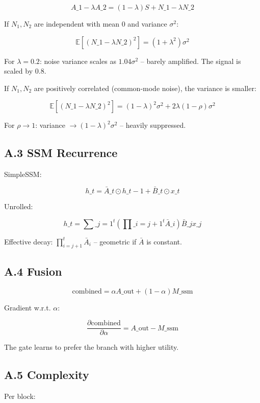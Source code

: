 \[
A\_1 - \lambda A\_2 = (1 - \lambda) S + N\_1 - \lambda N\_2
\tag{A.4}
\]

If $N_1, N_2$ are independent with mean 0 and variance $\sigma^2$:

\[
\mathbb{E}[(N\_1 - \lambda N\_2)^2] = (1 + \lambda^2) \sigma^2
\tag{A.5}
\]

For $\lambda = 0.2$: noise variance scales as $1.04 \sigma^2$ -- barely 
amplified. The signal is scaled by $0.8$.

If $N_1, N_2$ are positively correlated (common-mode noise), the variance 
is smaller:

\[
\mathbb{E}[(N\_1 - \lambda N\_2)^2] = (1 - \lambda)^2 \sigma^2 + 2\lambda(1 - \rho) \sigma^2
\tag{A.6}
\]

For $\rho \to 1$: variance $\to (1 - \lambda)^2 \sigma^2$ -- heavily 
suppressed.

\subsection{A.3 SSM Recurrence}

SimpleSSM:

\[
h\_t = \bar{A}\_t \odot h\_{t-1} + \bar{B}\_t \odot x\_t
\tag{A.7}
\]

Unrolled:

\[
h\_t = \sum\_{j=1}^{t} \left( \prod\_{i=j+1}^{t} \bar{A}\_i \right) \bar{B}\_j x\_j
\tag{A.8}
\]

Effective decay: $\prod_{i=j+1}^t \bar{A}_i$ -- geometric if $\bar{A}$ is 
constant.

\subsection{A.4 Fusion}

\[
\text{combined} = \alpha A\_\text{out} + (1 - \alpha) M\_\text{ssm}
\tag{A.9}
\]

Gradient w.r.t. $\alpha$:

\[
\frac{\partial \text{combined}}{\partial \alpha} = A\_\text{out} - M\_\text{ssm}
\tag{A.10}
\]

The gate learns to prefer the branch with higher utility.

\subsection{A.5 Complexity}

Per block:

